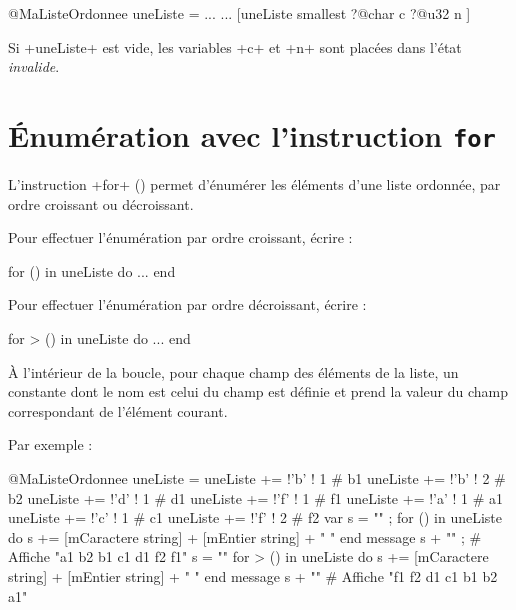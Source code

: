 \begin{galgas4}
@MaListeOrdonnee uneListe = ...
...
[uneListe smallest
  ?@char c
  ?@u32 n
]
\end{galgas4}

Si \ggsq+uneListe+ est vide, les variables \ggsq+c+ et \ggsq+n+ sont placées dans l'état \emph{invalide}.




\section{Énumération avec l'instruction \texttt{for}}

L'instruction \ggsq+for+ () permet d'énumérer les éléments d'une liste ordonnée, par ordre croissant ou décroissant.

Pour effectuer l'énumération par ordre croissant, écrire :
\begin{galgas4}
for () in uneListe do
  ...
end
\end{galgas4}

Pour effectuer l'énumération par ordre décroissant, écrire :
\begin{galgas4}
for > () in uneListe do
  ...
end
\end{galgas4}

À l'intérieur de la boucle, pour chaque champ des éléments de la liste, un constante dont le nom est celui du champ est définie et prend la valeur du champ correspondant de l'élément courant.

Par exemple :

\begin{galgas4}
@MaListeOrdonnee uneListe = {}
uneListe += !'b' ! 1 # b1
uneListe += !'b' ! 2 # b2
uneListe += !'d' ! 1 # d1
uneListe += !'f' ! 1 # f1
uneListe += !'a' ! 1 # a1
uneListe += !'c' ! 1 # c1
uneListe += !'f' ! 2 # f2
var s = "" ;
for () in uneListe do
  s += [mCaractere string] + [mEntier string] + " "
end
message s + "\n" ; # Affiche "a1 b2 b1 c1 d1 f2 f1"
s = ""
for > () in uneListe do
  s += [mCaractere string] + [mEntier string] + " "
end
message s + "\n" # Affiche "f1 f2 d1 c1 b1 b2 a1"
\end{galgas4}

